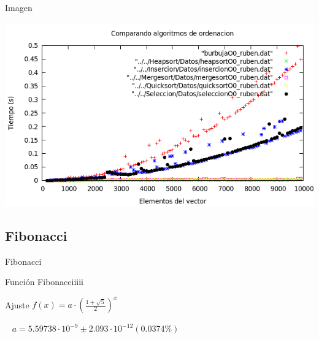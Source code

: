 \documentclass[compress]{beamer}
\begin{document}
\begin{frame}
	\begin{alertblock}{Imagen}
	\begin{center}
	\includegraphics[scale=0.45]{../Graficas/todos.png}
	\end{center}
	\end{alertblock}
\end{frame}




\subsection{Fibonacci}
\begin{frame}{Fibonacci}
	\begin{block}{Función}
		Fibonacciiiii
	\end{block}
	
	\begin{block}{Ajuste}
	$ f(x) = a\cdot   \left( \displaystyle\frac{1+\sqrt5}{2} \right)^x $

	{\ }
	$a               = 5.59738\cdot 10^{-9}      \pm 2.093\cdot 10^{-12}    (0.0374\%)$
	\end{block}
\end{frame}
\end{document}
